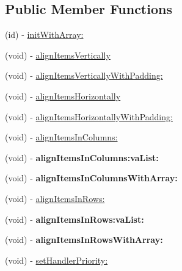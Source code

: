 \subsection*{Public Member Functions}
\begin{DoxyCompactItemize}
\item 
(id) -\/ \hyperlink{interface_c_c_menu_a44da9168cb742fcb231c109c4ae1d01a}{init\-With\-Array\-:}
\item 
(void) -\/ \hyperlink{interface_c_c_menu_a7ece4d7eefbf5a7ec83c10fb17c35c97}{align\-Items\-Vertically}
\item 
(void) -\/ \hyperlink{interface_c_c_menu_aa5d86bac5fe76a7faf9389b768333ce2}{align\-Items\-Vertically\-With\-Padding\-:}
\item 
(void) -\/ \hyperlink{interface_c_c_menu_a45144e502b1ac45aba167c84f9f0f1a9}{align\-Items\-Horizontally}
\item 
(void) -\/ \hyperlink{interface_c_c_menu_aae6aa55b63b389c8cc94f26a7a8f59b3}{align\-Items\-Horizontally\-With\-Padding\-:}
\item 
(void) -\/ \hyperlink{interface_c_c_menu_a13c62aa7f16a63afae59adaa590044bb}{align\-Items\-In\-Columns\-:}
\item 
\hypertarget{interface_c_c_menu_aa61f5f2702080ab7ad5f7b12b42cb055}{(void) -\/ {\bfseries align\-Items\-In\-Columns\-:va\-List\-:}}\label{interface_c_c_menu_aa61f5f2702080ab7ad5f7b12b42cb055}

\item 
\hypertarget{interface_c_c_menu_ae326eff0400e0027cdae9a339d523b3a}{(void) -\/ {\bfseries align\-Items\-In\-Columns\-With\-Array\-:}}\label{interface_c_c_menu_ae326eff0400e0027cdae9a339d523b3a}

\item 
(void) -\/ \hyperlink{interface_c_c_menu_a0c145a2d34a66950a7bea8a09d61a040}{align\-Items\-In\-Rows\-:}
\item 
\hypertarget{interface_c_c_menu_afe4e5486e231bea4522b62a549fee8ac}{(void) -\/ {\bfseries align\-Items\-In\-Rows\-:va\-List\-:}}\label{interface_c_c_menu_afe4e5486e231bea4522b62a549fee8ac}

\item 
\hypertarget{interface_c_c_menu_af4a436603314e35388568fe864cd8eb1}{(void) -\/ {\bfseries align\-Items\-In\-Rows\-With\-Array\-:}}\label{interface_c_c_menu_af4a436603314e35388568fe864cd8eb1}

\item 
(void) -\/ \hyperlink{interface_c_c_menu_adf0a18c931f6e72356af38cd9e2a62cc}{set\-Handler\-Priority\-:}
\end{DoxyCompactItemize}
